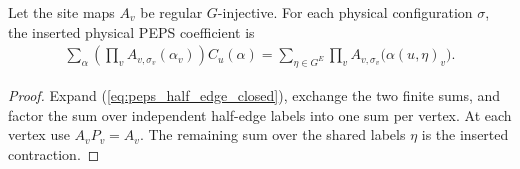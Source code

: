\begin{lemma}%
    \label{thm:peps_regular_closed_physical_contraction}
    \leanok
    Let the site maps $A_v$ be regular $G$-injective. For each physical
    configuration $\sigma$, the inserted physical PEPS coefficient is
    \begin{align}
        \sum_\alpha\left(\prod_v A_{v,\sigma_v}(\alpha_v)\right)C_u(\alpha)
        =\sum_{\eta\in G^E}\prod_v
        A_{v,\sigma_v}\bigl(\alpha(u,\eta)_v\bigr).
    \end{align}
\end{lemma}

\begin{proof}\leanok
    Expand (\ref{eq:peps_half_edge_closed}), exchange the two finite sums,
    and factor the sum over independent half-edge labels into one sum
    per vertex. At each vertex use $A_vP_v=A_v$. The remaining sum
    over the shared labels $\eta$ is the inserted contraction.
\end{proof}
